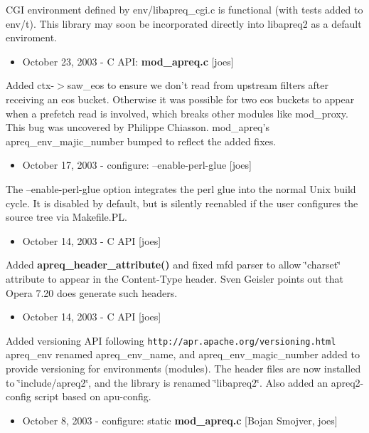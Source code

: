CGI environment defined by env/libapreq\_\-cgi.c is functional (with tests added to env/t). This library may soon be incorporated directly into libapreq2 as a default enviroment.

\begin{itemize}
\item October 23, 2003 - C API: {\bf mod\_\-apreq.c} [joes]\end{itemize}


Added ctx-$>$saw\_\-eos to ensure we don't read from upstream filters after receiving an eos bucket. Otherwise it was possible for two eos buckets to appear when a prefetch read is involved, which breaks other modules like mod\_\-proxy. This bug was uncovered by Philippe Chiasson. mod\_\-apreq's apreq\_\-env\_\-majic\_\-number bumped to reflect the added fixes.

\begin{itemize}
\item October 17, 2003 - configure: --enable-perl-glue [joes]\end{itemize}


The --enable-perl-glue option integrates the perl glue into the normal Unix build cycle. It is disabled by default, but is silently reenabled if the user configures the source tree via Makefile.PL.

\begin{itemize}
\item October 14, 2003 - C API [joes]\end{itemize}


Added {\bf apreq\_\-header\_\-attribute()} and fixed mfd parser to allow \char`\"{}charset\char`\"{} attribute to appear in the Content-Type header. Sven Geisler points out that Opera 7.20 does generate such headers.

\begin{itemize}
\item October 14, 2003 - C API [joes]\end{itemize}


Added versioning API following {\tt http://apr.apache.org/versioning.html} apreq\_\-env renamed apreq\_\-env\_\-name, and apreq\_\-env\_\-magic\_\-number added to provide versioning for environments (modules). The header files are now installed to \char`\"{}include/apreq2\char`\"{}, and the library is renamed \char`\"{}libapreq2\char`\"{}. Also added an apreq2-config script based on apu-config.

\begin{itemize}
\item October 8, 2003 - configure: static {\bf mod\_\-apreq.c} [Bojan Smojver, joes]\end{itemize}


